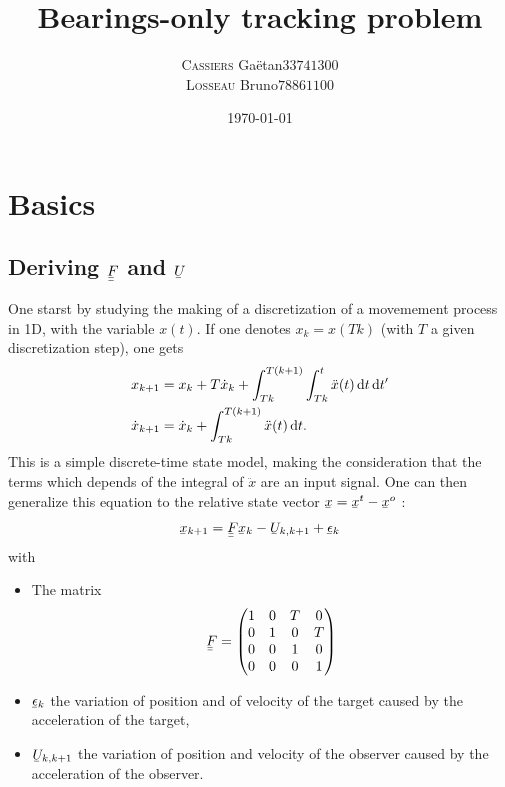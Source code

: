 \documentclass[english,DIV=13]{scrreprt}
\title{Bearings-only tracking problem}
\subtitle{}
\author{\begin{tabular}{cc}
	\textsc{Cassiers} Gaëtan  & 	$33741300$ \\
	\textsc{Losseau} Bruno 	&	$78861100$
	 \end{tabular}}
\date{\today}
\newcommand{\ubar}[1]{\underaccent{\bar}{#1}}
\newcommand{\uvec}[1]{\ubar{#1}}
\newcommand{\umatrix}[1]{\ubar{\ubar{#1}}}
\begin{document}
\maketitle


\tableofcontents


\chapter{Basics}
\section*{Deriving $\umatrix{F}$ and $\uvec{U}$}

One starst by studying the making of a discretization of a movemement process in 1D, with the
variable $x(t)$. If one denotes $x_k = x(Tk)$ (with $T$ a given discretization step), one gets
\begin{align*}
    x_{k+1} &= x_k + T\dot{x}_k + \int_{Tk}^{T(k+1)}\int_{Tk}^{t}\ddot{x}(t)\operatorname{d}\! t\operatorname{d}\! t' \\
    \dot{x}_{k+1} &=  \dot{x}_k + \int_{Tk}^{T(k+1)}\ddot{x}(t)\operatorname{d}\! t.
\end{align*}
This is a simple discrete-time state model, making the consideration that the terms which depends of
the integral of $\ddot{x}$
are an input signal.
One can then generalize this equation to the relative state vector $\uvec{x} = \uvec{x}^t - \uvec{x}^o$ :
\[\uvec{x}_{k+1} = \umatrix{F}\uvec{x}_k - \uvec{U}_{k,k+1} + \uvec{\epsilon}_k\]
with
\begin{itemize}
    \item The matrix
        \[\umatrix{F} =
        \begin{pmatrix}
            1 & 0 & T & 0 \\
            0 & 1 & 0 & T \\   
            0 & 0 & 1 & 0 \\
            0 & 0 & 0 & 1   
        \end{pmatrix}
        \]
    \item $\uvec{\epsilon}_k$ the variation of position and of velocity of the target caused by the
acceleration of the target,
    \item $\uvec{U}_{k,k+1}$ the variation of position and velocity of
the observer caused by the acceleration of the observer.
\end{itemize}
\end{document}
